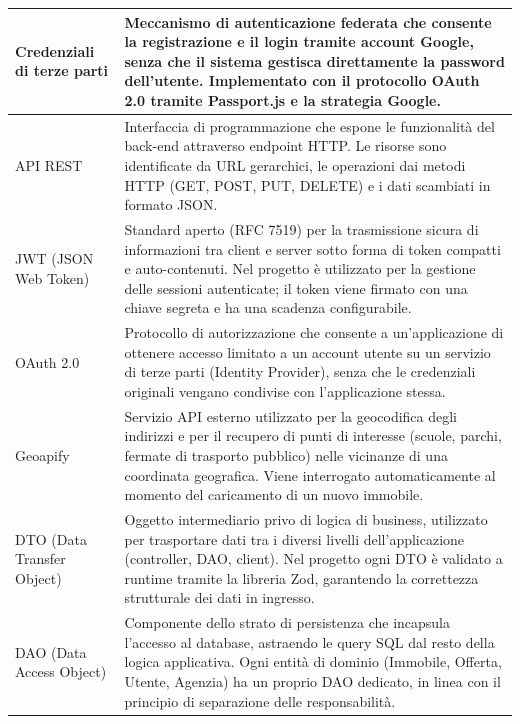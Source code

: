 \documentclass[a4paper,11pt]{article}
\begin{document}
\begin{longtable}{|p{4.2cm}|p{10.5cm}|}
Credenziali di terze parti &
Meccanismo di autenticazione federata che consente la registrazione e il login tramite account Google, senza che il sistema gestisca direttamente la password dell'utente. Implementato con il protocollo OAuth 2.0 tramite Passport.js e la strategia Google. \\ \hline

API REST &
Interfaccia di programmazione che espone le funzionalità del back-end attraverso endpoint HTTP. Le risorse sono identificate da URL gerarchici, le operazioni dai metodi HTTP (GET, POST, PUT, DELETE) e i dati scambiati in formato JSON. \\ \hline

JWT (JSON Web Token) &
Standard aperto (RFC 7519) per la trasmissione sicura di informazioni tra client e server sotto forma di token compatti e auto-contenuti. Nel progetto è utilizzato per la gestione delle sessioni autenticate; il token viene firmato con una chiave segreta e ha una scadenza configurabile. \\ \hline

OAuth 2.0 &
Protocollo di autorizzazione che consente a un'applicazione di ottenere accesso limitato a un account utente su un servizio di terze parti (Identity Provider), senza che le credenziali originali vengano condivise con l'applicazione stessa. \\ \hline

Geoapify &
Servizio API esterno utilizzato per la geocodifica degli indirizzi e per il recupero di punti di interesse (scuole, parchi, fermate di trasporto pubblico) nelle vicinanze di una coordinata geografica. Viene interrogato automaticamente al momento del caricamento di un nuovo immobile. \\ \hline

DTO (Data Transfer Object) &
Oggetto intermediario privo di logica di business, utilizzato per trasportare dati tra i diversi livelli dell'applicazione (controller, DAO, client). Nel progetto ogni DTO è validato a runtime tramite la libreria Zod, garantendo la correttezza strutturale dei dati in ingresso. \\ \hline

DAO (Data Access Object) &
Componente dello strato di persistenza che incapsula l'accesso al database, astraendo le query SQL dal resto della logica applicativa. Ogni entità di dominio (Immobile, Offerta, Utente, Agenzia) ha un proprio DAO dedicato, in linea con il principio di separazione delle responsabilità. \\ \hline


\end{longtable}
\end{document}

